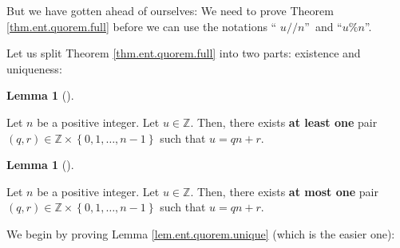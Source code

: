 \documentclass[numbers=enddot,12pt,final,onecolumn,notitlepage]{scrartcl}%
\numberwithin{exer}{subsection}
\theoremstyle{definition}
\newtheorem{lem}[theo]{Lemma}
\newenvironment{lemma}[1][]
{\begin{lem}[#1]\begin{leftbar}}
{\end{leftbar}\end{lem}}
\begin{document}
But we have gotten ahead of ourselves: We need to prove Theorem
\ref{thm.ent.quorem.full} before we can use the notations \textquotedblleft%
$u//n$\textquotedblright\ and \textquotedblleft$u\%n$\textquotedblright.

Let us split Theorem \ref{thm.ent.quorem.full} into two parts: existence and uniqueness:

\begin{lemma}
\label{lem.ent.quorem.exist}Let $n$ be a positive integer. Let $u\in
\mathbb{Z}$. Then, there exists \textbf{at least one} pair $\left(
q,r\right)  \in\mathbb{Z}\times\left\{  0,1,\ldots,n-1\right\}  $ such that
$u=qn+r$.
\end{lemma}

\begin{lemma}
\label{lem.ent.quorem.unique}Let $n$ be a positive integer. Let $u\in
\mathbb{Z}$. Then, there exists \textbf{at most one} pair $\left(  q,r\right)
\in\mathbb{Z}\times\left\{  0,1,\ldots,n-1\right\}  $ such that $u=qn+r$.
\end{lemma}

We begin by proving Lemma \ref{lem.ent.quorem.unique} (which is the easier one):
\end{document}

